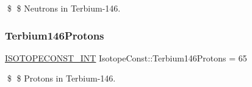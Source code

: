 \$ \$ Neutrons in Terbium-\/146. \mbox{\label{group___isotope_const-_terbium-_tb146_gada1f268b791e3e0156932a975a6ba73a}} 
\subsubsection{\texorpdfstring{Terbium146\+Protons}{Terbium146Protons}}
{\footnotesize\ttfamily \mbox{\hyperlink{group___isotope_const-_macros_ga5f18360b3e99483a35c32d789e62621c}{I\+S\+O\+T\+O\+P\+E\+C\+O\+N\+S\+T\+\_\+\+I\+NT}} Isotope\+Const\+::\+Terbium146\+Protons = 65}

\$ \$ Protons in Terbium-\/146. 
